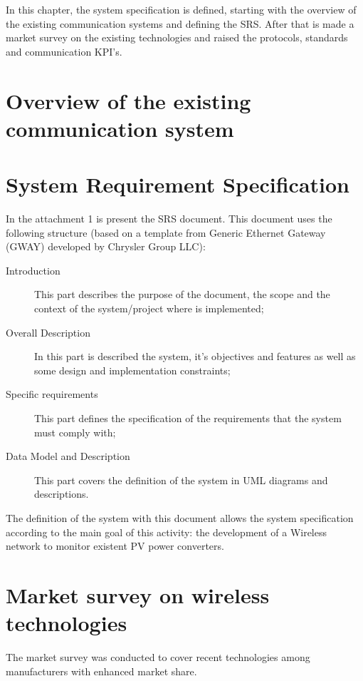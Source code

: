 
In this chapter, the system specification is defined, starting with the overview of the existing communication systems and defining the SRS. After that is made a market survey on the existing technologies and raised the protocols, standards and communication KPI's.



\section{Overview of the existing communication system}
\lipsum[1-4]


\section{System Requirement Specification}
In the attachment 1 is present the SRS document. This document uses the following structure (based on a template from Generic Ethernet Gateway (GWAY) developed by Chrysler Group LLC):
\begin{description}
	\item[Introduction] This part describes the purpose of the document, the scope and the context of the system/project where is implemented;
	
	\item[Overall Description] In this part is described the system, it's objectives and features as well as some design and implementation constraints;
	
	\item[Specific requirements] This part defines the specification of the requirements that the system must comply with;
	
	\item[Data Model and Description] This part covers the definition of the system in UML diagrams and descriptions.
			
\end{description}

The definition of the system with this document allows the system specification according to the main goal of this activity: the development of a Wireless network to monitor existent PV power converters.

\section{Market	survey on wireless technologies}
The market survey was conducted to cover recent technologies among manufacturers with enhanced market share.

